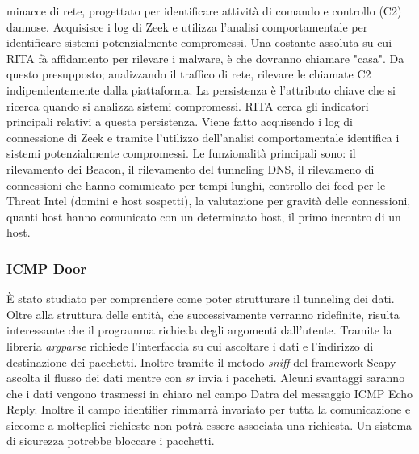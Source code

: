 \begin{frame}
minacce di rete, progettato per identificare attività 
di comando e controllo (C2) dannose. Acquisisce i log 
di Zeek e utilizza l'analisi comportamentale per 
identificare sistemi potenzialmente compromessi. 
\vspace{1ex} \newline 
Una costante assoluta su cui RITA fà affidamento per rilevare i malware, è che dovranno chiamare "casa". 
Da questo presupposto; analizzando il traffico di rete, rilevare le chiamate C2 indipendentemente dalla piattaforma. 
La persistenza è l'attributo chiave che si ricerca quando si analizza sistemi compromessi. 
RITA cerca gli indicatori principali relativi a questa persistenza. 
Viene fatto acquisendo i log di connessione di Zeek e tramite l'utilizzo dell'analisi comportamentale 
identifica i sistemi potenzialmente compromessi. 
\vspace{2ex} \newline 
Le funzionalità principali sono: 
il rilevamento dei Beacon, il rilevamento del tunneling DNS, il rilevameno di connessioni che hanno comunicato per tempi lunghi, 
controllo dei feed per le Threat Intel (domini e host sospetti), la valutazione per gravità delle connessioni, quanti host hanno comunicato 
con un determinato host, il primo incontro di un host. 
\end{frame} 
%
\begin{frame}
\frametitle{ICMP Door}
\MakeUppercase{è} stato studiato per comprendere come 
poter strutturare il tunneling dei dati. 
Oltre alla struttura delle entità, che successivamente 
verranno ridefinite, risulta interessante che il 
programma richieda degli argomenti dall'utente. 
Tramite la libreria \textit{argparse} richiede 
l'interfaccia su cui ascoltare i dati e l'indirizzo 
di destinazione dei pacchetti. 
Inoltre tramite il metodo \textit{sniff} del framework 
Scapy ascolta il flusso dei dati mentre  con \textit{sr} 
invia i paccheti. 
\vspace{2ex} \newline 
Alcuni svantaggi saranno che i dati vengono trasmessi in chiaro 
nel campo Datra del messaggio ICMP Echo Reply. Inoltre 
il campo identifier rimmarrà invariato per tutta la 
comunicazione e siccome a molteplici richieste non 
potrà essere associata una richiesta. Un sistema di sicurezza 
potrebbe bloccare i pacchetti. 
\end{frame}
%
